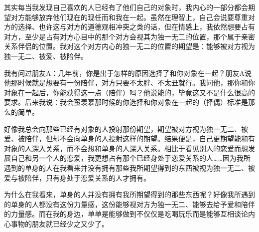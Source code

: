 其实每当我发现自己喜欢的人已经有了他们自己的对象时，我内心的一部分都会期望对方能够放弃他们现在的现任而和我在一起。虽然在理智上，自己会说要尊重对方的选择、也许这与对方的道德观相冲突之类的话，但在情感上，我依然想要占有对方，至少是占有对方心目中的那个对方会视其为独一无二的位置，那个属于亲密关系伴侣的位置。我对这个对方内心的独一无二的位置的期望是：能够被对方视为独一无二、被爱、被陪伴。

我有问过朋友A：几年前，你是出于怎样的原因选择了和你对象在一起？朋友A说他那时候就是想要有一份陪伴，对方只要不太胖、不太丑就行。我问他，那你和你对象在一起后，你能获得这一点（陪伴）吗？他说能的，毕竟这又不是什么很高的要求。后来我说：我会蛮羡慕那时候的你选择和你对象在一起的（择偶）标准是那么的简单。

好像我总会向那些已经有对象的人投射那份期望，期望被对方视为独一无二、被爱、被陪伴，但却不会向单身的人投射这样的期望。结果便是，自己更期望能和有对象的人深入关系，而不会想和单身的人深入关系。相比于看见别人的恋爱而想发展自己和另一个人的恋爱，我更想占有那个已经身处于恋爱关系的人……因为我所遇到的单身的人在我看来并没有拥有那些我所期望得到的东西\pozhehao{}被视为独一无二、被爱与被陪伴，只有身处于恋爱关系的人才拥有。

为什么在我看来，单身的人并没有拥有我所期望得到的那些东西呢？好像我所遇到的单身的人都没有这份力量感，这份能够视对方为独一无二、能够去给予爱和陪伴的力量感。而在我的身边，单单是能够做到不仅仅是吃喝玩乐而是能够互相谈论内心事物的朋友就已经少之又少了。


